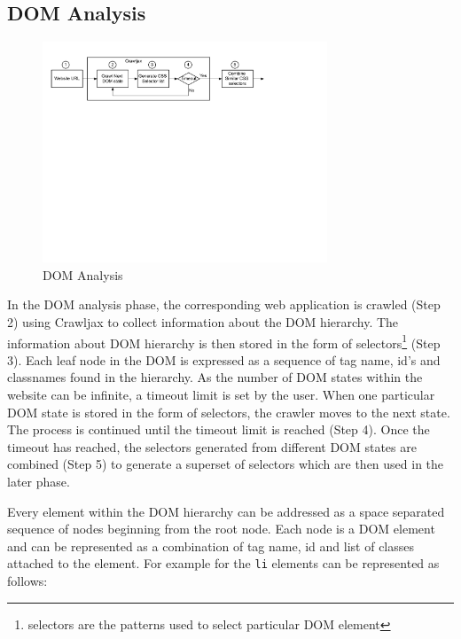 	\subsection{DOM Analysis}
	\label{Sec:DOM-Analysis}
		\begin{figure}
			\centering
			\includegraphics[width=85mm]{images/dom_analysis.pdf}
			\caption{DOM Analysis}
			\label{Fig:DOM-Analysis}
		\end{figure}
		In the DOM analysis phase, the corresponding web application is crawled (Step 2) using Crawljax \cite{crawljax:tweb12} to collect information about the DOM hierarchy. The information about DOM hierarchy is then stored in the form of \css selectors\footnote{\css selectors are the patterns used to select particular DOM element} (Step 3). Each leaf node in the DOM is expressed as a sequence of tag name, id's and classnames found in the hierarchy. As the number of DOM states within the website can be infinite, a timeout limit is set by the user. When one particular DOM state is stored in the form of \css selectors, the crawler moves to the next state. The process is continued until the timeout limit is reached (Step 4). Once the timeout has reached, the \css selectors generated from different DOM states are combined (Step 5) to generate a superset of \css selectors which are then used in the later phase.
		
		Every element within the DOM hierarchy can be addressed as a space separated sequence of nodes beginning from the root node. Each node is a DOM element and can be represented as a combination of tag name, id and list of classes attached to the element. For example for  the \texttt{li} elements can be represented as follows:
			
